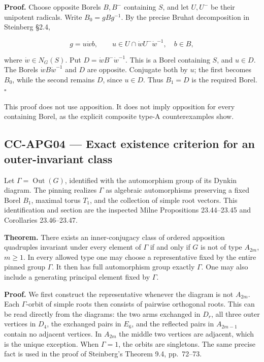 \documentclass[11pt,a4paper]{article}
\theoremstyle{definition}\newtheorem{definition}[theorem]{Definition}
\theoremstyle{remark}\newtheorem{remark}[theorem]{Remark}
\begin{document}
\textbf{Proof.} Choose opposite Borels \(B,B^{-}\) containing \(S\), and
let \(U,U^{-}\) be their unipotent radicals. Write \(B_0=gBg^{-1}\). By
the precise Bruhat decomposition in Steinberg §2.4,

\[
 g=u\dot w b,\qquad
 u\in U\cap\dot wU^{-}\dot w^{-1},\quad b\in B,
\]

where \(\dot w\in N_G(S)\). Put \(D=\dot wB^{-}\dot w^{-1}\). This is a
Borel containing \(S\), and \(u\in D\). The Borels
\(\dot wB\dot w^{-1}\) and \(D\) are opposite. Conjugate both by \(u\);
the first becomes \(B_0\), while the second remains \(D\), since
\(u\in D\). Thus \(B_1=D\) is the required Borel. \(\square\)

This proof does not use apposition. It does not imply opposition for
every containing Borel, as the explicit composite type-A counterexamples
show.

\subsection{CC-APG04 --- Exact existence criterion for an
outer-invariant
class}\label{cc-apg04-exact-existence-criterion-for-an-outer-invariant-class}

Let \(\Gamma=\operatorname{Out}(G)\), identified with the automorphism
group of its Dynkin diagram. The pinning realizes \(\Gamma\) as
algebraic automorphisms preserving a fixed Borel \(B_1\), maximal torus
\(T_1\), and the collection of simple root vectors. This identification
and section are the inspected Milne Propositions 23.44--23.45 and
Corollaries 23.46--23.47.

\textbf{Theorem.} There exists an inner-conjugacy class of ordered
apposition quadruples invariant under every element of \(\Gamma\) if and
only if \(G\) is not of type \(A_{2m}\), \(m\geq1\). In every allowed
type one may choose a representative fixed by the entire pinned group
\(\Gamma\). It then has full automorphism group exactly \(\Gamma\). One
may also include a generating principal element fixed by \(\Gamma\).

\textbf{Proof.} We first construct the representative whenever the
diagram is not \(A_{2m}\). Each \(\Gamma\)-orbit of simple roots then
consists of pairwise orthogonal roots. This can be read directly from
the diagrams: the two arms exchanged in \(D_r\), all three outer
vertices in \(D_4\), the exchanged pairs in \(E_6\), and the reflected
pairs in \(A_{2m-1}\) contain no adjacent vertices. In \(A_{2m}\) the
middle two vertices are adjacent, which is the unique exception. When
\(\Gamma=1\), the orbits are singletons. The same precise fact is used
in the proof of Steinberg's Theorem 9.4, pp.~72--73.
\end{document}
